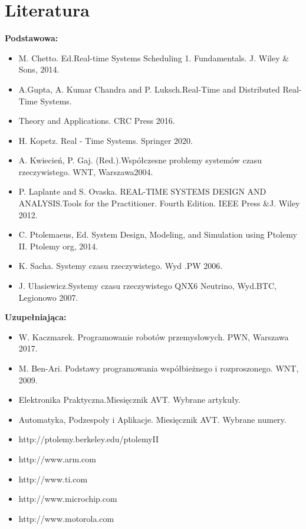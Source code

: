 \documentclass[12pt, a4paper]{article}
\begin{document}
\section{Literatura}

\textbf{Podstawowa:}
\begin{itemize}
  \item M. Chetto. Ed.Real-time Systems Scheduling 1. Fundamentals. J. Wiley \& Sons, 2014.
  \item A.Gupta, A. Kumar Chandra and P. Luksch.Real-Time and Distributed Real-Time Systems.
  \item Theory and Applications. CRC Press 2016.
  \item H. Kopetz. Real - Time Systems. Springer 2020.
  \item A. Kwiecień, P. Gaj. (Red.).Współczesne problemy systemów czasu rzeczywistego. WNT, Warszawa2004.
  \item P. Laplante and S. Ovaska. REAL-TIME SYSTEMS DESIGN AND ANALYSIS.Tools for the Practitioner. Fourth Edition. IEEE Press \&J. Wiley 2012.
  \item C. Ptolemaeus, Ed. System Design, Modeling, and Simulation using Ptolemy II. Ptolemy org, 2014.
  \item K. Sacha. Systemy czasu rzeczywistego. Wyd .PW  2006.
  \item J. Ułasiewicz.Systemy czasu rzeczywistego QNX6 Neutrino, Wyd.BTC, Legionowo 2007.
\end{itemize}

\textbf{Uzupełniająca:}
\begin{itemize}
  \item W. Kaczmarek. Programowanie robotów przemysłowych. PWN, Warszawa 2017.
  \item M. Ben-Ari. Podstawy programowania współbieżnego i rozproszonego. WNT, 2009.
  \item Elektronika Praktyczna.Miesięcznik AVT. Wybrane artykuły.
  \item Automatyka, Podzespoły i Aplikacje. Miesięcznik AVT. Wybrane numery.
  \item http://ptolemy.berkeley.edu/ptolemyII
  \item http://www.arm.com
  \item http://www.ti.com
  \item http://www.microchip.com
  \item http://www.motorola.com
\end{itemize}
\end{document}
